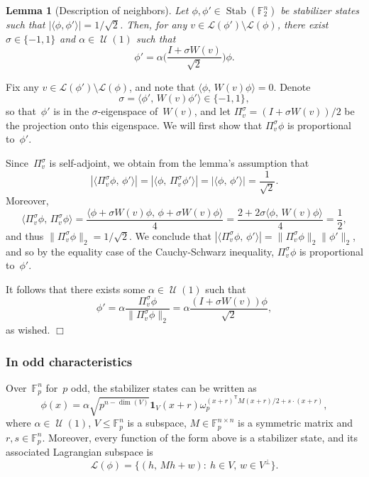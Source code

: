 \documentclass[11pt]{amsart}
\DeclareMathOperator{\Stab}{Stab}\DeclareMathOperator{\Spec}{Spec}
\newcommand{\F}{\mathbb{F}} %
\newcommand{\Lcal}{\mathcal{L}}
\newcommand{\pmset}[1]{\{-1,1\}^{#1}} %
\newcommand{\one}{\mathbf{1}}
\DeclareMathOperator{\U}{\mathcal{U}}
\newcommand{\tp}{\mathsf{T}}
\theoremstyle{plain}
\newtheorem{lemma}[theorem]{Lemma}
\theoremstyle{definition}
\theoremstyle{remark}
\renewenvironment{proof}[1][]{
    	\begin{trivlist}
     	\item[\hspace{\labelsep}{\em\noindent Proof#1:\/}]}
     	{{\hfill$\Box$}
    	\end{trivlist}
  }
\begin{document}
\begin{lemma}[Description of neighbors] \label{lem:neighbors}
    Let $\phi, \phi' \in \Stab(\F_2^n)$ be stabilizer states such that $|\langle\phi, \phi'\rangle| = 1/\sqrt{2}$.
    Then, for any $v\in \Lcal(\phi')\setminus \Lcal(\phi)$, there exist $\sigma\in \pmset{}$ and $\alpha\in \U(1)$ such that
    $$\phi' = \alpha \bigg(\frac{I+ \sigma W(v)}{\sqrt{2}}\bigg) \phi.$$
\end{lemma}

\begin{proof}
Fix any $v\in \Lcal(\phi')\setminus \Lcal(\phi)$, and note that $\langle\phi,\, W(v)\phi\rangle = 0$.
Denote
$$\sigma = \langle\phi',\, W(v)\phi'\rangle \in \pmset{},$$ so that~$\phi'$ is in the $\sigma$-eigenspace of~$W(v)$, and let $\Pi_v^{\sigma} = (I+ \sigma W(v))/2$ be the projection onto this eigenspace.
We will first show that $\Pi_v^\sigma \phi$ is proportional to~$\phi'$.

Since~$\Pi_v^{\sigma}$ is self-adjoint, we obtain from the lemma's assumption that
$$|\langle\Pi_v^{\sigma} \phi,\, \phi'\rangle| = |\langle\phi,\, \Pi_v^{\sigma} \phi'\rangle| = |\langle\phi,\, \phi'\rangle| = \frac{1}{\sqrt{2}}.$$
Moreover,
$$\langle\Pi_v^{\sigma} \phi,\, \Pi_v^{\sigma} \phi\rangle = \frac{\big\langle\phi+ \sigma W(v)\phi,\, \phi+ \sigma W(v)\phi\big\rangle}{4} = \frac{2+ 2\sigma \langle\phi,\, W(v)\phi\rangle}{4} = \frac{1}{2},$$
and thus $\|\Pi_v^{\sigma} \phi\|_2 = 1/\sqrt{2}$.
We conclude that $|\langle\Pi_v^{\sigma} \phi,\, \phi'\rangle| = \|\Pi_v^{\sigma} \phi\|_2 \|\phi'\|_2$, and so by the equality case of the Cauchy-Schwarz inequality, $\Pi_v^{\sigma} \phi$ is proportional to~$\phi'$.

It follows that there exists some $\alpha\in \U(1)$ such that
$$\phi' = \alpha \frac{\Pi_v^{\sigma} \phi}{\|\Pi_v^{\sigma} \phi\|_2} = \alpha \frac{(I+\sigma W(v)) \phi}{\sqrt{2}},$$
as wished.
\end{proof}


\subsubsection{In odd characteristics}
Over~$\F_p^n$ for~$p$ odd, the stabilizer states can be written as
\begin{equation} \label{eq:explicit_odd}
    \phi(x) = \alpha \sqrt{p^{n-\dim(V)}} \one_V(x+r) \omega_p^{(x+r)^\tp M(x+r)/2 + s\cdot(x+r)},
\end{equation}
where $\alpha\in \U(1)$, $V\leq \F_p^n$ is a subspace, $M\in \F_p^{n\times n}$ is a symmetric matrix and $r, s \in \F_p^n$.
Moreover, every function of the form above is a stabilizer state, and its associated Lagrangian subspace is
$$\Lcal(\phi) = \big\{(h,\, Mh+w):\: h\in V,\, w\in V^\perp\big\}.$$
\end{document}
